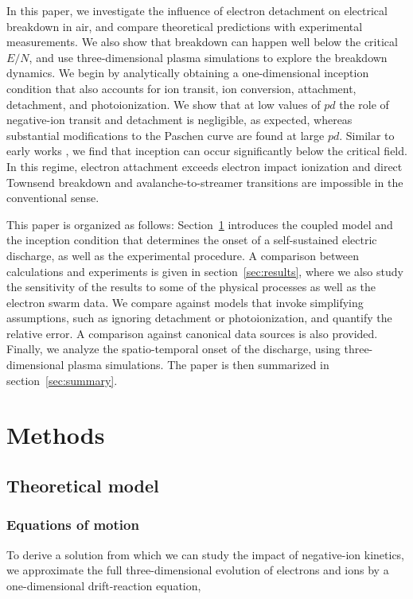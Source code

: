 \documentclass{iopjournal}
\begin{document}
In this paper, we investigate the influence of electron detachment on electrical breakdown in air, and compare theoretical predictions with experimental measurements.
We also show that breakdown can happen well below the critical $E/N$, and use three-dimensional plasma simulations to explore the breakdown dynamics.
We begin by analytically obtaining a one-dimensional inception condition that also accounts for ion transit, ion conversion, attachment, detachment, and photoionization.
We show that at low values of $pd$ the role of negative-ion transit and detachment is negligible, as expected, whereas substantial modifications to the Paschen curve are found at large $pd$.
Similar to early works \cite{Frommhold1964, Teich1991, Pancheshnyi2013, Zhao2016}, we find that inception can occur significantly below the critical field.
In this regime, electron attachment exceeds electron impact ionization and direct Townsend breakdown and avalanche-to-streamer transitions are impossible in the conventional sense.

This paper is organized as follows:
Section~\ref{sec:methods} introduces the coupled model and the inception condition that determines the onset of a self-sustained electric discharge, as well as the experimental procedure.
A comparison between calculations and experiments is given in section~\ref{sec:results}, where we also study the sensitivity of the results to some of the physical processes as well as the electron swarm data.
We compare against models that invoke simplifying assumptions, such as ignoring detachment or photoionization, and quantify the relative error.
A comparison against canonical data sources is also provided.
Finally, we analyze the spatio-temporal onset of the discharge, using three-dimensional plasma simulations.
The paper is then summarized in section~\ref{sec:summary}.

\section{Methods}
\label{sec:methods}

\subsection{Theoretical model}
\label{sec:model}
\subsubsection{Equations of motion}
To derive a solution from which we can study the impact of negative-ion kinetics, we approximate the full three-dimensional evolution of electrons and ions by a one-dimensional drift-reaction equation,
\end{document}
